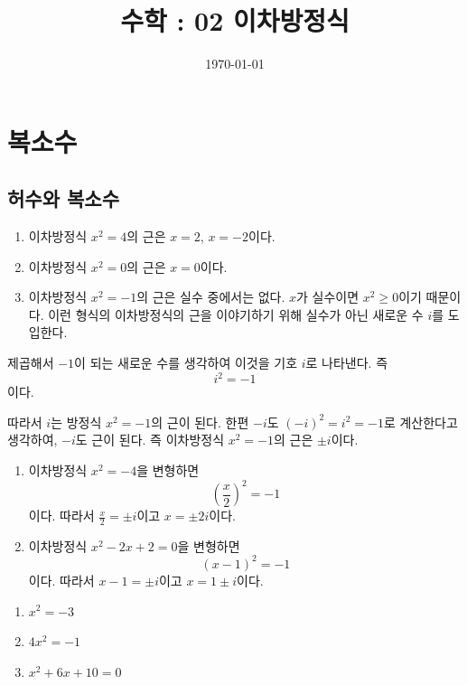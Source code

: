 \documentclass{oblivoir}
\begin{document}
\title{수학 : 02 이차방정식}
\author{}
\date{\today}
\maketitle
\tableofcontents
\newpage

\section{복소수}

\subsection{허수와 복소수}

%
\exam{}
\begin{enumerate}
\item
이차방정식 \(x^2=4\)의 근은 \(x=2\), \(x=-2\)이다.
\item
이차방정식 \(x^2=0\)의 근은 \(x=0\)이다.
\item
이차방정식 \(x^2=-1\)의 근은 실수 중에서는 없다.
\(x\)가 실수이면 \(x^2\ge0\)이기 때문이다.
이런 형식의 이차방정식의 근을 이야기하기 위해 실수가 아닌 새로운 수 \(i\)를 도입한다.
\end{enumerate}

%
\begin{mdframed}
제곱해서 \(-1\)이 되는 새로운 수를 생각하여 이것을 기호 \(i\)로 나타낸다.
즉
\[i^2=-1\]
이다.
\end{mdframed}
따라서 \(i\)는 방정식 \(x^2=-1\)의 근이 된다.
한편 \(-i\)도 \((-i)^2=i^2=-1\)로 계산한다고 생각하여, \(-i\)도 근이 된다.
즉 이차방정식 \(x^2=-1\)의 근은 \(\pm i\)이다.

%
\exam{}
\begin{enumerate}\label{comp1}
\item
이차방정식 \(x^2=-4\)을 변형하면
\[\left(\frac x2\right)^2=-1\]
이다.
따라서 \(\frac x2=\pm i\)이고 \(x=\pm2i\)이다.
\item
이차방정식 \(x^2-2x+2=0\)을 변형하면
\[(x-1)^2=-1\]
이다.
따라서 \(x-1=\pm i\)이고 \(x=1\pm i\)이다.
\end{enumerate}

%
\begin{enumerate}\label{comp2}
\item
\(x^2=-3\)
\item
\(4x^2=-1\)
\item
\(x^2+6x+10=0\)
\end{enumerate}
\end{document}

